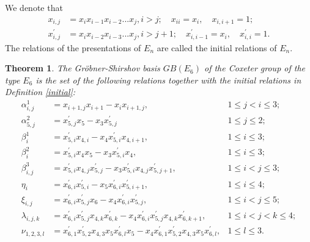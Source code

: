\documentclass[UTF8]{amsart}
\newtheorem{theorem}[tpcl]{Theorem}
\theoremstyle{definition}
\theoremstyle{remark}
\numberwithin{equation}{section}
\begin{document}
We denote that
\begin{align*}
x_{i,j}&=x_ix_{i-1}x_{i-2}...x_{j}, i>j; \quad x_{ii}=x_i, \quad x_{i,i+1}=1;\\
x_{i,j}^{'}&=x_ix_{i-2}x_{i-3}...x_{j},i>j+1; \quad x_{i,i-1}^{'}=x_{i},\quad x_{i,i}^{'}=1.
\end{align*}
The relations of the presentations of $E_n$ are called the initial relations of $E_n$.
\begin{theorem}\label{GBE6}
	The Gr\"{o}bner-Shirshov basis $GB(E_6)$ of the Coxeter group of the type $E_6$ is the set of the following relations together with the initial relations in Definition \ref{initial}:
	\begin{align*}
		\alpha_{i,j}^1&=x_{i+1,j}x_{i+1}-x_ix_{i+1,j} ,&1\leq j<i\leq3;\\
		\alpha_{5,j}^2&=x_{5,j}^{'}x_5-x_3x_{5,j}^{'} &1\leq j\leq 2;\\
		\beta_i^1&=x_{5,i}^{'}x_{4,i}-x_4x_{5,i}^{'}x_{4,i+1}, &1\leq i\leq3;\\
		\beta_i^2&=x_{5,i}^{'}x_4x_5-x_3x_{5,i}^{'}x_4 , &1\leq i\leq3;\\
		\beta_{i,j}^3&=x_{5,i}^{'}x_{4,j}x_{5,j}^{'}-x_3x_{5,i}^{'}x_{4,j}x_{5,j+1}^{'} ,&1\leq i<j\leq3;\\
		\eta_i&=x_{6,i}^{'}x_{5,i}^{'}-x_5x_{6,i}^{'}x_{5,i+1}^{'}, &1\leq i\leq4;\\
		\xi_{i,j}&=x_{6,i}^{'}x_{5,j}^{'}x_6-x_4x_{6,i}^{'}x_{5,j}^{'} ,&1\leq i<j\leq5;\\
		\lambda_{i,j,k}&=x_{6,i}^{'}x_{5,j}^{'}x_{4,k}x_{6,k}^{'}-x_4x_{6,i}^{'}x_{5,j}^{'}x_{4,k}x_{6,k+1}^{'} ,&1\leq i<j<k\leq4;\\
		\nu_{1,2,3,l}&=x_{6,1}^{'}x_{5,2}^{'}x_{4,3}x_5x_{6,l}^{'}x_5-x_4x_{6,1}^{'}x_{5,2}^{'}x_{4,3}x_5x_{6,l}^{'} ,&1\leq l\leq3.
	\end{align*}
\end{theorem}
\end{document}
